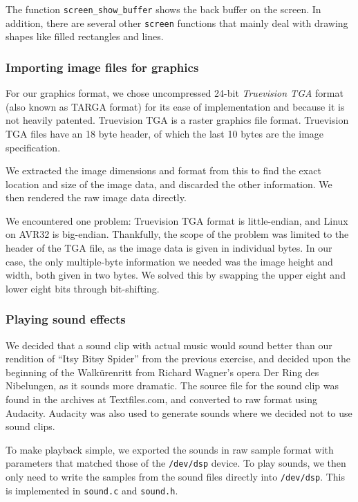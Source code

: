 

The function \texttt{screen\_show\_buffer} shows the back buffer on the
screen. In addition, there are several other \texttt{screen} functions
that mainly deal with drawing shapes like filled rectangles and lines.

\subsubsection{Importing image files for graphics}

For our graphics format, we chose uncompressed 24-bit \emph{Truevision
TGA} format (also known as TARGA format) for its ease of implementation
and because it is not heavily patented. Truevision TGA is a raster
graphics file format. Truevision TGA files have an 18 byte header, of
which the last 10 bytes are the image specification.

We extracted the image dimensions and format from this to find the exact
location and size of the image data, and discarded the other
information. We then rendered the raw image data directly.


We encountered one problem: Truevision TGA format is little-endian, and
Linux on AVR32 is big-endian. Thankfully, the scope of the problem was
limited to the header of the TGA file, as the image data is given in
individual bytes. In our case, the only multiple-byte information we
needed was the image height and width, both given in two bytes. We
solved this by swapping the upper eight and lower eight bits through
bit-shifting.

\subsubsection{Playing sound effects}

We decided that a sound clip with actual music would sound better than
our rendition of ``Itsy Bitsy Spider'' from the previous exercise, and
decided upon the beginning of the Walkürenritt from Richard Wagner's
opera Der Ring des Nibelungen, as it sounds more dramatic. The source
file for the sound clip was found in the archives at Textfiles.com, and
converted to raw format using Audacity. Audacity was also used to
generate sounds where we decided not to use sound clips.

To make playback simple, we exported the sounds in raw sample format
with parameters that matched those of the \texttt{/dev/dsp} device. To
play sounds, we then only need to write the samples from the sound files
directly into \texttt{/dev/dsp}. This is implemented in \texttt{sound.c}
and \texttt{sound.h}.


